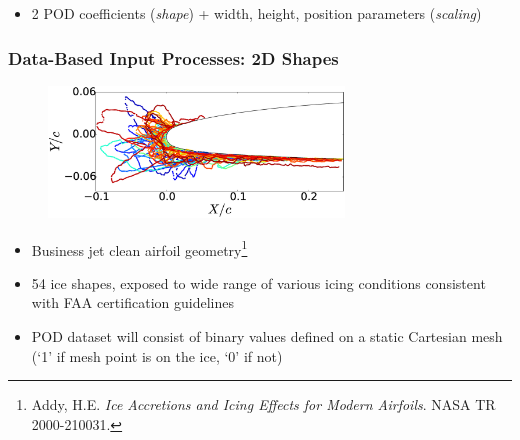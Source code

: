 \documentclass[9pt]{beamer}
\begin{document}
\begin{frame}
\begin{itemize}
\item 2 POD coefficients (\emph{shape}) + width, height, position parameters (\emph{scaling})
\end{itemize}
\end{frame}
\begin{frame}
\frametitle{Data-Based Input Processes: 2D Shapes}
\label{sec-2-5}


\begin{figure}
  \centering
  \includegraphics[width=0.7\textwidth]{Dataset}
\end{figure}

\begin{itemize}
\item Business jet clean airfoil geometry\footnote{Addy, H.E. \emph{Ice Accretions and Icing Effects for Modern Airfoils}. NASA TR 2000-210031.
 }
\item 54 ice shapes, exposed to wide range of various icing conditions
  consistent with FAA certification guidelines
\item POD dataset will consist of binary values defined on a static
  Cartesian mesh (`1' if mesh point is on the ice, `0' if not)
\end{itemize}
\end{frame}
\end{document}
